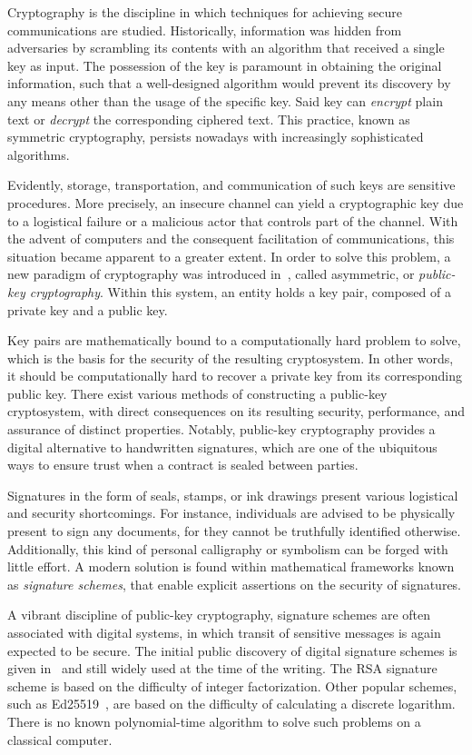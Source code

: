 \documentclass[12pt, a4paper, oneside]{memoir}
\theoremstyle{definition}
\begin{document}
Cryptography is the discipline in which techniques for achieving secure communications are studied. Historically, information was hidden from adversaries by scrambling its contents with an algorithm that received a single key as input. The possession of the key is paramount in obtaining the original information, such that a well-designed algorithm would prevent its discovery by any means other than the usage of the specific key. Said key can \emph{encrypt} plain text or \emph{decrypt} the corresponding ciphered text. This practice, known as symmetric cryptography, persists nowadays with increasingly sophisticated algorithms.

Evidently, storage, transportation, and communication of such keys are sensitive procedures. More precisely, an insecure channel can yield a cryptographic key due to a logistical failure or a malicious actor that controls part of the channel. With the advent of computers and the consequent facilitation of communications, this situation became apparent to a greater extent. In order to solve this problem, a new paradigm of cryptography was introduced in~\cite{Diffie:197611}, called asymmetric, or \emph{public-key cryptography}. Within this system, an entity holds a key pair, composed of a private key and a public key. 

Key pairs are mathematically bound to a computationally hard problem to solve, which is the basis for the security of the resulting cryptosystem. In other words, it should be computationally hard to recover a private key from its corresponding public key. There exist various methods of constructing a public-key cryptosystem, with direct consequences on its resulting security, performance, and assurance of distinct properties. Notably, public-key cryptography provides a digital alternative to handwritten signatures, which are one of the ubiquitous ways to ensure trust when a contract is sealed between parties. 

Signatures in the form of seals, stamps, or ink drawings present various logistical and security shortcomings. For instance, individuals are advised to be physically present to sign any documents, for they cannot be truthfully identified otherwise. Additionally, this kind of personal calligraphy or symbolism can be forged with little effort. A modern solution is found within mathematical frameworks known as \emph{signature schemes}, that enable explicit assertions on the security of signatures. 

A vibrant discipline of public-key cryptography, signature schemes are often associated with digital systems, in which transit of sensitive messages is again expected to be secure. The initial public discovery of digital signature schemes is given in~\cite{Rivest:197802} and still widely used at the time of the writing. The RSA signature scheme is based on the difficulty of integer factorization. Other popular schemes, such as Ed25519~\cite{Bernstein:201208}, are based on the difficulty of calculating a discrete logarithm. There is no known polynomial-time algorithm to solve such problems on a classical computer.
\end{document}
